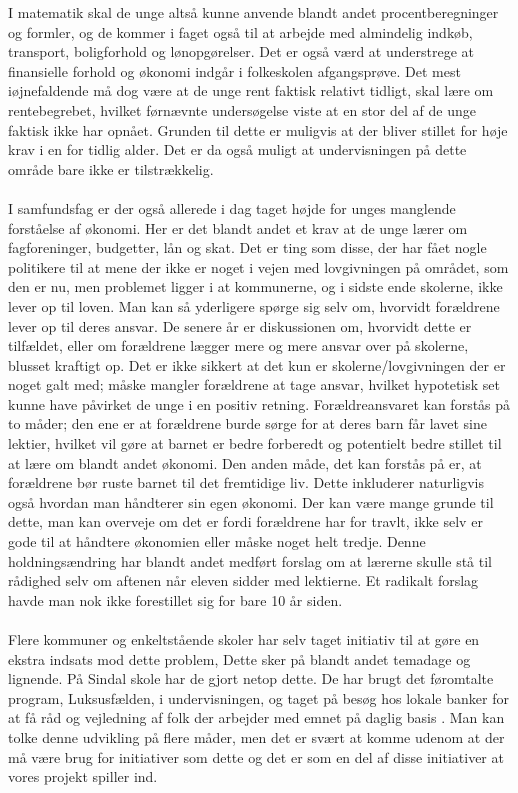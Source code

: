I matematik skal de unge altså kunne anvende blandt andet procentberegninger og formler, og de kommer i faget også til at arbejde med almindelig indkøb, transport, boligforhold og lønopgørelser. Det er også værd at understrege at finansielle forhold og økonomi indgår i folkeskolen afgangsprøve. Det mest iøjnefaldende må dog være at de unge rent faktisk relativt tidligt, skal lære om rentebegrebet, hvilket førnævnte undersøgelse viste at en stor del af de unge faktisk ikke har opnået. Grunden til dette er muligvis at der bliver stillet for høje krav i en for tidlig alder. Det er da også muligt at undervisningen på dette område bare ikke er tilstrækkelig.\\
\\
I samfundsfag er der også allerede i dag taget højde for unges manglende forståelse af økonomi. Her er det blandt andet et krav at de unge lærer om fagforeninger, budgetter, lån og skat. Det er ting som disse, der har fået nogle politikere til at mene der ikke er noget i vejen med lovgivningen på området, som den er nu, men problemet ligger i at kommunerne, og i sidste ende skolerne, ikke lever op til loven\cite{BusinessDK3}. Man kan så yderligere spørge sig selv om, hvorvidt forældrene lever op til deres ansvar. De senere år er diskussionen om, hvorvidt dette er tilfældet, eller om forældrene lægger mere og mere ansvar over på skolerne, blusset kraftigt op. Det er ikke sikkert at det kun er skolerne/lovgivningen der er noget galt med; måske mangler forældrene at tage ansvar, hvilket hypotetisk set kunne have påvirket de unge i en positiv retning. Forældreansvaret kan forstås på to måder; den ene er at forældrene burde sørge for at deres barn får lavet sine lektier, hvilket vil gøre at barnet er bedre forberedt og potentielt bedre stillet til at lære om blandt andet økonomi. Den anden måde, det kan forstås på er, at forældrene bør ruste barnet til det fremtidige liv. Dette inkluderer naturligvis også hvordan man håndterer sin egen økonomi. Der kan være mange grunde til dette, man kan overveje om det er fordi forældrene har for travlt, ikke selv er gode til at håndtere økonomien eller måske noget helt tredje. Denne holdningsændring har blandt andet medført forslag om at lærerne skulle stå til rådighed selv om aftenen når eleven sidder med lektierne. Et radikalt forslag havde man nok ikke forestillet sig for bare 10 år siden\cite{ForaldreAnsvar}.\\
\\
Flere kommuner og enkeltstående skoler har selv taget initiativ til at gøre en ekstra indsats mod dette problem, Dette sker på blandt andet temadage og lignende. På Sindal skole har de gjort netop dette. De har brugt det føromtalte program, Luksusfælden, i undervisningen, og taget på besøg hos lokale banker for at få råd og vejledning af folk der arbejder med emnet på daglig basis \cite{Sindal}. Man kan tolke denne udvikling på flere måder, men det er svært at komme udenom at der må være brug for initiativer som dette og det er som en del af disse initiativer at vores projekt spiller ind.\\
